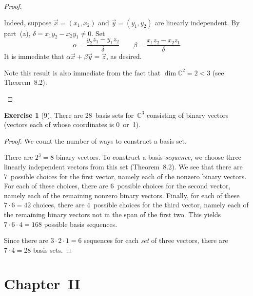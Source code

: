 \documentclass[letterpaper,12pt]{article}
\newcommand{\C}{\mathbb{C}}
\theoremstyle{definition}
\newtheorem*{exer}{Exercise}
\theoremstyle{remark}
\theoremstyle{direction}
\begin{document}
\begin{proof}
\begin{enumerate}
Indeed, suppose \(\vec{x}=(x_1,x_2)\) and \(\vec{y}=(y_1,y_2)\) are linearly independent. By part~(a), \(\delta=x_1y_2-x_2y_1\ne0\). Set
\[
\alpha=\frac{y_2z_1-y_1z_2}{\delta}
\qquad
\beta=\frac{x_1z_2-x_2z_1}{\delta}
\]
It is immediate that \(\alpha\vec{x}+\beta\vec{y}=\vec{z}\), as desired.

Note this result is also immediate from the fact that \(\dim\C^2=2<3\) (see Theorem~8.2).\qedhere
\end{enumerate}
\end{proof}
\begin{exer}[9]
There are 28~basis sets for~\(\C^3\) consisting of binary vectors (vectors each of whose coordinates is 0~or~1).
\end{exer}
\begin{proof}
We count the number of ways to construct a basis set.

There are \(2^3=8\) binary vectors. To construct a basis \emph{sequence}, we choose three linearly independent vectors from this set (Theorem~8.2). We see that there are 7~possible choices for the first vector, namely each of the nonzero binary vectors. For each of these choices, there are 6~possible choices for the second vector, namely each of the remaining nonzero binary vectors. Finally, for each of these \(7\cdot6=42\) choices, there are 4~possible choices for the third vector, namely each of the remaining binary vectors not in the span of the first two. This yields \(7\cdot6\cdot4=168\) possible basis sequences.

Since there are \(3\cdot2\cdot1=6\) sequences for each \emph{set} of three vectors, there are \(7\cdot4=28\) basis sets.
\end{proof}
\section*{Chapter~II}
\end{document}
